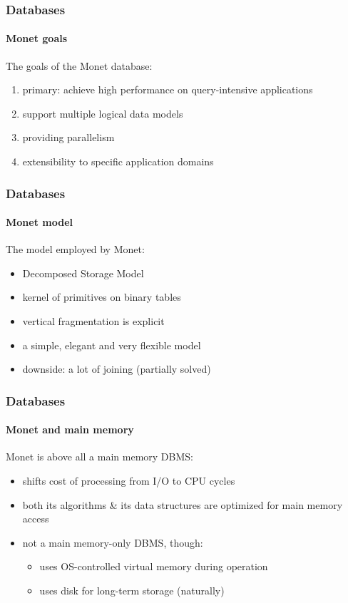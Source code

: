 \documentclass{beamer}
\begin{document}
\begin{frame}
  \frametitle{Databases}
  \framesubtitle{Monet goals}

The goals of the Monet database:
\begin{enumerate}
\item \alert{primary: achieve high performance on query-intensive applications}
\pause
\item support multiple logical data models
\item providing parallelism
\item extensibility to specific application domains
\end{enumerate}

\end{frame}

\begin{frame}
  \frametitle{Databases}
  \framesubtitle{Monet model}

The model employed by Monet:
\begin{itemize}
\item Decomposed Storage Model
\item kernel of primitives on binary tables
\pause
\item vertical fragmentation is explicit
\pause
\item a simple, elegant and very flexible model
\pause
\item downside: a lot of joining (partially solved)
\end{itemize}

\end{frame}

\begin{frame}
  \frametitle{Databases}
  \framesubtitle{Monet and main memory}

Monet is above all a main memory DBMS:
\begin{itemize}
\item shifts cost of processing from I/O to CPU cycles
\item both its algorithms \& its data structures are optimized for main memory access
\item not a main memory-only DBMS, though:
\begin{itemize}
\item uses OS-controlled virtual memory during operation
\item uses disk for long-term storage (naturally)
\end{itemize}
\end{itemize}

\end{frame}
\end{document}

